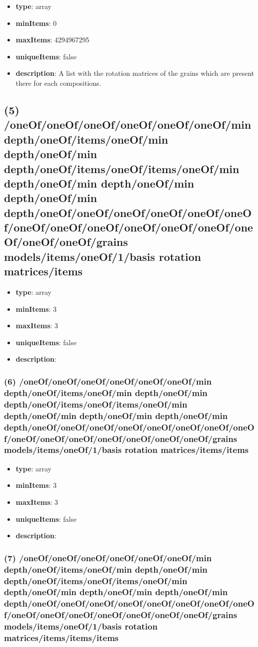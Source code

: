 \begin{itemize}[leftmargin=4em]\item {\bf type}: array
\item {\bf minItems}: 0
\item {\bf maxItems}: 4294967295
\item {\bf uniqueItems}: false
\item {\bf description}: A list with the rotation matrices of the grains which are present there for each compositions.
\end{itemize}\subsection{(5) /oneOf/oneOf/oneOf/oneOf/oneOf/oneOf/min depth/oneOf/items/oneOf/min depth/oneOf/min depth/oneOf/items/oneOf/items/oneOf/min depth/oneOf/min depth/oneOf/min depth/oneOf/min depth/oneOf/oneOf/oneOf/oneOf/oneOf/oneOf/oneOf/oneOf/oneOf/oneOf/oneOf/oneOf/oneOf/oneOf/oneOf/grains models/items/oneOf/1/basis rotation matrices/items}
\begin{itemize}[leftmargin=5em]\item {\bf type}: array
\item {\bf minItems}: 3
\item {\bf maxItems}: 3
\item {\bf uniqueItems}: false
\item {\bf description}: 
\end{itemize}\subsubsection{(6) /oneOf/oneOf/oneOf/oneOf/oneOf/oneOf/min depth/oneOf/items/oneOf/min depth/oneOf/min depth/oneOf/items/oneOf/items/oneOf/min depth/oneOf/min depth/oneOf/min depth/oneOf/min depth/oneOf/oneOf/oneOf/oneOf/oneOf/oneOf/oneOf/oneOf/oneOf/oneOf/oneOf/oneOf/oneOf/oneOf/oneOf/grains models/items/oneOf/1/basis rotation matrices/items/items}
\begin{itemize}[leftmargin=6em]\item {\bf type}: array
\item {\bf minItems}: 3
\item {\bf maxItems}: 3
\item {\bf uniqueItems}: false
\item {\bf description}: 
\end{itemize}\subsubsection{(7) /oneOf/oneOf/oneOf/oneOf/oneOf/oneOf/min depth/oneOf/items/oneOf/min depth/oneOf/min depth/oneOf/items/oneOf/items/oneOf/min depth/oneOf/min depth/oneOf/min depth/oneOf/min depth/oneOf/oneOf/oneOf/oneOf/oneOf/oneOf/oneOf/oneOf/oneOf/oneOf/oneOf/oneOf/oneOf/oneOf/oneOf/grains models/items/oneOf/1/basis rotation matrices/items/items/items}
